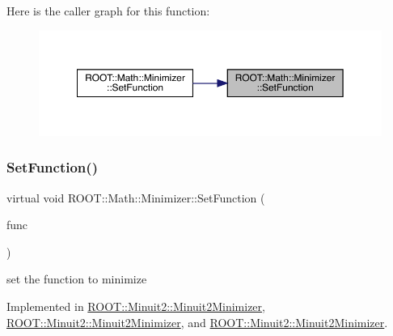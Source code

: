 Here is the caller graph for this function\+:
\nopagebreak
\begin{figure}[H]
\begin{center}
\leavevmode
\includegraphics[width=350pt]{dc/dc4/classROOT_1_1Math_1_1Minimizer_a4391c613ab0c3f9777e56b487ffa5eac_icgraph}
\end{center}
\end{figure}
\mbox{\label{classROOT_1_1Math_1_1Minimizer_a4391c613ab0c3f9777e56b487ffa5eac}} 
\subsubsection{\texorpdfstring{SetFunction()}{SetFunction()}\hspace{0.1cm}{\footnotesize\ttfamily [2/6]}}
{\footnotesize\ttfamily virtual void R\+O\+O\+T\+::\+Math\+::\+Minimizer\+::\+Set\+Function (\begin{DoxyParamCaption}\item[{const \mbox{\hyperlink{namespaceROOT_1_1Math_aec22897f3d759f7c284893c81d980799}{R\+O\+O\+T\+::\+Math\+::\+I\+Multi\+Gen\+Function}} \&}]{func }\end{DoxyParamCaption})\hspace{0.3cm}{\ttfamily [pure virtual]}}



set the function to minimize 



Implemented in \mbox{\hyperlink{classROOT_1_1Minuit2_1_1Minuit2Minimizer_ae18efc66a943fe11b1114ff8c1b28ad0}{R\+O\+O\+T\+::\+Minuit2\+::\+Minuit2\+Minimizer}}, \mbox{\hyperlink{classROOT_1_1Minuit2_1_1Minuit2Minimizer_ae18efc66a943fe11b1114ff8c1b28ad0}{R\+O\+O\+T\+::\+Minuit2\+::\+Minuit2\+Minimizer}}, and \mbox{\hyperlink{classROOT_1_1Minuit2_1_1Minuit2Minimizer_ae18efc66a943fe11b1114ff8c1b28ad0}{R\+O\+O\+T\+::\+Minuit2\+::\+Minuit2\+Minimizer}}.

